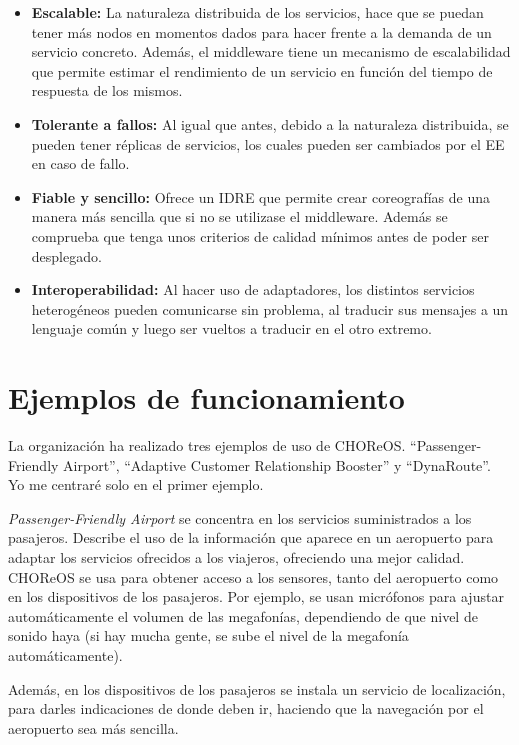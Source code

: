 \documentclass[runningheads]{llncs}
\begin{document}
\begin{itemize}
    \item \textbf{Escalable: }La naturaleza distribuida de los servicios, hace que se puedan tener más nodos en momentos dados para hacer frente a la demanda de un servicio concreto. Además, el middleware tiene un mecanismo de escalabilidad que permite estimar el rendimiento de un servicio en función del tiempo de respuesta de los mismos.
    \item \textbf{Tolerante a fallos: }Al igual que antes, debido a la naturaleza distribuida, se pueden tener réplicas de servicios, los cuales pueden ser cambiados por el EE en caso de fallo.
    \item \textbf{Fiable y sencillo: }Ofrece un IDRE que permite crear coreografías de una manera más sencilla que si no se utilizase el middleware. Además se comprueba que tenga unos criterios de calidad mínimos antes de poder ser desplegado.
    \item \textbf{Interoperabilidad: }Al hacer uso de adaptadores, los distintos servicios heterogéneos pueden comunicarse sin problema, al traducir sus mensajes a un lenguaje común y luego ser vueltos a traducir en el otro extremo.~\cite{a_2}
\end{itemize}
\section{Ejemplos de funcionamiento}
La organización ha realizado tres ejemplos de uso de CHOReOS. ``Passenger-Friendly Airport'', ``Adaptive Customer Relationship Booster'' y ``DynaRoute''.~\cite{a_2} Yo me centraré solo en el primer ejemplo.

\textit{Passenger-Friendly Airport} se concentra en los servicios suministrados a los pasajeros. Describe el uso de la información que aparece en un aeropuerto para adaptar los servicios ofrecidos a los viajeros, ofreciendo una mejor calidad. CHOReOS se usa para obtener acceso a los sensores, tanto del aeropuerto como en los dispositivos de los pasajeros. Por ejemplo, se usan micrófonos para ajustar automáticamente el volumen de las megafonías, dependiendo de que nivel de sonido haya (si hay mucha gente, se sube el nivel de la megafonía automáticamente).~\cite{a_128}

Además, en los dispositivos de los pasajeros se instala un servicio de localización, para darles indicaciones de donde deben ir, haciendo que la navegación por el aeropuerto sea más sencilla.~\cite{a_128}
\end{document}
